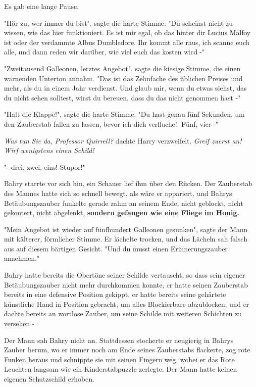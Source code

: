 {Es gab eine lange Pause.

"Hör zu, wer immer du bist", sagte die harte Stimme. "Du scheinst nicht zu wissen, wie das hier funktioniert. Es ist mir egal, ob das hinter dir Lucius Malfoy ist oder der verdammte Albus Dumbledore. Ihr kommt alle raus, ich scanne euch alle, und dann reden wir darüber, wie viel euch das kosten wird -"

"Zweitausend Galleonen, letztes Angebot", sagte die kiesige Stimme, die einen warnenden Unterton annahm. "Das ist das Zehnfache des üblichen Preises und mehr, als du in einem Jahr verdienst. Und glaub mir, wenn du etwas siehst, das du nicht sehen solltest, wirst du bereuen, dass du das nicht genommen hast -"

"Halt die Klappe!", sagte die harte Stimme. "Du hast genau fünf Sekunden, um den Zauberstab fallen zu lassen, bevor ich dich verfluche!. Fünf, vier -"

\emph{\hfill\break Was tun Sie da, Professor Quirrell?} dachte Harry verzweifelt. \emph{Greif zuerst an! Wirf wenigstens einen Schild!}

"- drei, zwei, eins! Stupor!"

Bahry starrte vor sich hin, ein Schauer lief ihm über den Rücken. Der Zauberstab des Mannes hatte sich so schnell bewegt, als wäre er appariert, und Bahrys Betäubungszauber funkelte gerade zahm an seinem Ende, nicht geblockt, nicht gekontert, nicht abgelenkt, \textbf{sondern gefangen wie eine Fliege im Honig.}

"Mein Angebot ist wieder auf fünfhundert Galleonen gesunken", sagte der Mann mit kälterer, förmlicher Stimme. Er lächelte trocken, und das Lächeln sah falsch aus auf diesem bärtigen Gesicht. "Und du musst einen Erinnerungszauber annehmen."

Bahry hatte bereits die Obertöne seiner Schilde vertauscht, so dass sein eigener Betäubungszauber nicht mehr durchkommen konnte, er hatte seinen Zauberstab bereits in eine defensive Position gekippt, er hatte bereits seine gehärtete künstliche Hand in Position gebracht, um alles Blockierbare abzublocken, und er dachte bereits an wortlose Zauber, um seine Schilde mit weiteren Schichten zu versehen -

Der Mann sah Bahry nicht an. Stattdessen stocherte er neugierig in Bahrys Zauber herum, wo er immer noch am Ende seines Zauberstabs flackerte, zog rote Funken heraus und schnippte sie mit seinen Fingern weg, wobei er das Rote Leuchten langsam wie ein Kinderstabpuzzle zerlegte. Der Mann hatte keinen eigenen Schutzschild erhoben.

}
